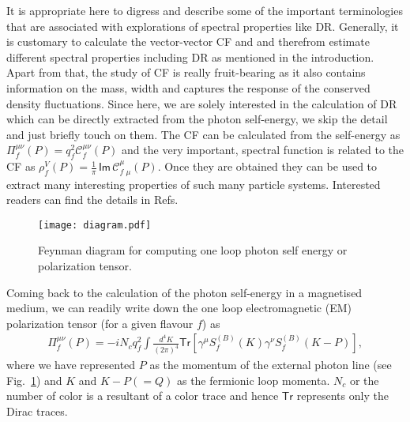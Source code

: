 \documentclass[aps,prd,floatfix,showpacs,showkeys,superscriptadress,unsortedaddress,nofootinbib,onecolumn]{revtex4-1}
\newcommand{\sF}{\scriptscriptstyle{f}}
\newcommand{\sB}{\scriptscriptstyle{(B)}}
\newcommand{\sV}{\scriptscriptstyle{V}}
\begin{document}
It is appropriate here to digress and describe some of the important terminologies that are associated with explorations of spectral properties like DR. Generally, it is customary to calculate the vector-vector CF and and therefrom estimate different spectral properties including DR as mentioned in the introduction. Apart from that, the study of CF is really fruit-bearing as it also contains information on the mass, width and captures the response of the conserved density fluctuations. Since here, we are solely interested in the calculation of DR which can be directly extracted from the photon self-energy, we skip the detail and just briefly touch on them. The CF can be calculated from the self-energy as $\Pi^{\mu\nu}_{\sF}(P) = q_{\sF}^2\mathcal{C}^{\mu\nu}_{\sF}(P)$ and the very important, spectral function is related to the CF as $\rho_{\sF}^{\sV}(P) = \frac{1}{\pi}\,\mathsf{Im}\,\mathcal{C}_{f\,\,\mu}^{\mu}(P).$ Once they are obtained they can be used to extract many interesting properties of such many particle systems.  Interested readers can find the details in Refs.~\cite{Forster:1975pm,Callen:1951vq,Kubo:1957mj,Weldon:1990iw}

\begin{figure}
\texttt{[image: diagram.pdf]}
\caption{Feynman diagram for computing one loop photon self energy or polarization tensor.}
\label{fig:PPT_diag}
\end{figure}
Coming back to the calculation of the photon self-energy in a magnetised medium, we can readily write down the one loop electromagnetic (EM) polarization tensor (for a given flavour $f$) as 
\begin{align}
\Pi^{\mu\nu}_{\sF}(P) = -iN_cq_{\sF}^2\int\!\!\frac{d^4K}{(2\pi)^4}\mathsf{Tr}\left[\gamma^{\mu}S^{\sB}_{\sF}(K)\gamma^{\nu}S^{\sB}_{\sF}(K-P)\right],
\label{eq:photon_pol}
\end{align} 
where we have represented $P$ as the momentum of the external photon line (see Fig.~\ref{fig:PPT_diag}) and $K$ and $K-P(=Q)$ as the fermionic loop momenta. $N_c$ or the number of color is a resultant of a color trace and hence $\mathsf{Tr}$ represents only the Dirac traces.
\end{document}
